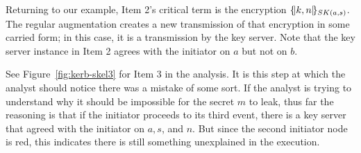 Returning to our example, Item 2's critical term is the encryption
$\{\!|k,n|\!\}_{SK(a,s)}$.  The regular augmentation creates a new
transmission of that encryption in some carried form; in this case, it
is a transmission by the key server.  Note that the key server
instance in Item 2 agrees with the initiator on $a$ but not on $b$.

See Figure~\ref{fig:kerb-skel3} for Item 3 in the analysis.  It is
this step at which the analyst should notice there was a mistake of
some sort.  If the analyst is trying to understand why it should be
impossible for the secret $m$ to leak, thus far the reasoning is that
if the initiator proceeds to its third event, there is a key server
that agreed with the initiator on $a, s$, and $n$.  But since the
second initiator node is red, this indicates there is still something
unexplained in the execution.

